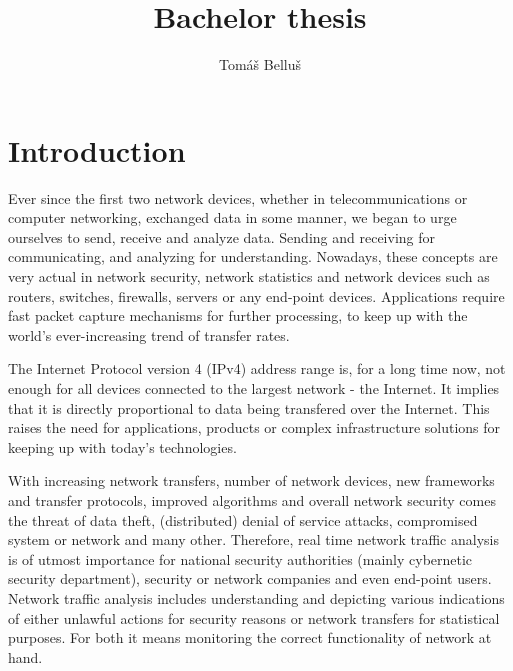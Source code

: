\documentclass[12pt,a4paper,twoside]{report}
\title{Bachelor thesis}
\author{Tomáš Belluš}
\begin{document}


\thispagestyle{empty}



\newpage{}\thispagestyle{empty}

\newpage
\thispagestyle{empty}
\mbox{}
\newpage







\begingroup
\color{black}
\tableofcontents
\endgroup

\chapter{Introduction}
	Ever since the first two network devices, whether in telecommunications or computer networking, exchanged data in some manner, we began to urge ourselves to send, receive and analyze data. Sending and receiving for communicating, and analyzing for understanding. Nowadays, these concepts are very actual in network security, network statistics and network devices such as routers, switches, firewalls, servers or any end-point devices. Applications require fast packet capture mechanisms for further processing, to keep up with the world's ever-increasing trend of transfer rates.\par
	The Internet Protocol version 4 (IPv4) address range is, for a long time now, not enough for all devices connected to the largest network - the Internet. It implies that it is directly proportional to data being transfered over the Internet. This raises the need for applications, products or complex infrastructure solutions for keeping up with today's technologies. \par
	With increasing network transfers, number of network devices, new frameworks and transfer protocols, improved algorithms and overall network security comes the threat of data theft, (distributed) denial of service attacks, compromised system or network and many other. Therefore, real time network traffic analysis is of utmost importance for national security authorities (mainly cybernetic security department), security or network companies and even end-point users. Network traffic analysis includes understanding and depicting various indications of either unlawful actions for security reasons or network transfers for statistical purposes. For both it means monitoring the correct functionality of network at hand.\par
\end{document}
